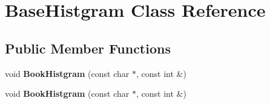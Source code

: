 \hypertarget{classBaseHistgram}{\section{Base\-Histgram Class Reference}
\label{classBaseHistgram}
}
\subsection*{Public Member Functions}
\begin{DoxyCompactItemize}
\item 
\hypertarget{classBaseHistgram_a51387b0ff683f7c3ec97438e7f08e8f0}{void {\bfseries Book\-Histgram} (const char $\ast$, const int \&)}\label{classBaseHistgram_a51387b0ff683f7c3ec97438e7f08e8f0}

\item 
\hypertarget{classBaseHistgram_a51387b0ff683f7c3ec97438e7f08e8f0}{void {\bfseries Book\-Histgram} (const char $\ast$, const int \&)}\label{classBaseHistgram_a51387b0ff683f7c3ec97438e7f08e8f0}

\end{DoxyCompactItemize}
